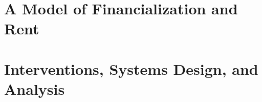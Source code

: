 \part{A Model of Financialization and Rent}








\part{Interventions, Systems Design, and Analysis}




\begin{comment}
TODO

- Get rent_and_growth from notes_and_references
- Check we got intro from TeXnicle
- Get notation from TeXnicle or overleaf
- Check - excess return on urban capital
- Check - amenity/financialized returns
- Get ODD protocol..

- Edit and put in the notes on methods from TeXnicle

- get Draft Scale  chapter 8 from TeXnicle

- Get tix diagrams in Overleaf - make series to see the plots and identify gaps

- Glossary and symbols pages
- Index
- Move figures into seperate files, ideally one file per series, edit figrues
- Bibliography
- Website up

\end{comment}
